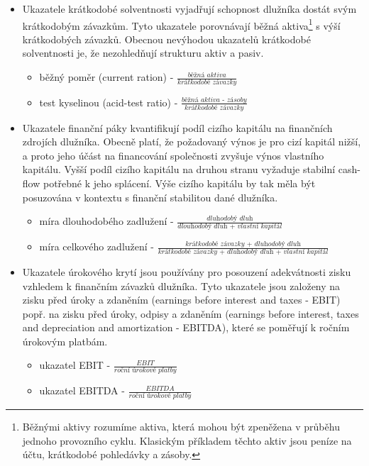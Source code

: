 \documentclass[a4paper]{book}
\begin{document}
\begin{itemize}
\item Ukazatele krátkodobé solventnosti vyjadřují schopnost dlužníka dostát svým krátkodobým závazkům. Tyto ukazatele porovnávají běžná aktiva\footnote{Běžnými aktivy rozumíme aktiva, která mohou být zpeněžena v průběhu jednoho provozního cyklu. Klasickým příkladem těchto aktiv jsou peníze na účtu, krátkodobé pohledávky a zásoby.} s výší krátkodobých závazků. Obecnou nevýhodou ukazatelů krátkodobé solventnosti je, že nezohledňují strukturu aktiv a pasiv.
\begin{itemize}
\item běžný poměr (current ration) - $\frac{\textit{b\v{e}\v{z}n\'{a} aktiva}}{\textit{kr\'{a}tkodob\'{e} z\'{a}vazky}}$
\item test kyselinou (acid-test ratio) - $\frac{\textit{b\v{e}\v{z}n\'{a} aktiva - z\'{a}soby}}{\textit{kr\'{a}tkodob\'{e} z\'{a}vazky}}$
\end{itemize}
\item Ukazatele finanční páky kvantifikují podíl cizího kapitálu na finančních zdrojích dlužníka. Obecně platí, že požadovaný výnos je pro cizí kapitál nižší, a proto jeho účást na financování společnosti zvyšuje výnos vlastního kapitálu. Vyšší podíl cizího kapitálu na druhou stranu vyžaduje stabilní cash-flow potřebné k jeho splácení. Výše cizího kapitálu by tak měla být posuzována v kontextu s finanční stabilitou dané dlužníka.
\begin{itemize}
\item míra dlouhodobého zadlužení - $\frac{\textit{dluhodob\'{y} dluh}}{\textit{dlouhodob\'{y} dluh + vlastn\'{i} kapit\'{a}l}}$
\item míra celkového zadlužení - $\frac{\textit{kr\'{a}tkodob\'{e} z\'{a}vazky + dluhodob\'{y} dluh}}{\textit{kr\'{a}tkodob\'{e} z\'{a}vazky + dluhodob\'{y} dluh + vlastn\'{i} kapit\'{a}l}}$
\end{itemize}
\item Ukazatele úrokového krytí jsou používány pro posouzení adekvátnosti zisku vzhledem k finančním závazků dlužníka. Tyto ukazatele jsou založeny na zisku před úroky a zdaněním (earnings before interest and taxes - EBIT) popř. na zisku před úroky, odpisy a zdaněním (earnings before interest, taxes and depreciation and amortization - EBITDA), které se poměřují k ročním úrokovým platbám.
\begin{itemize}
\item ukazatel EBIT - $\frac{\textit{EBIT}}{\textit{ro\v{c}n\'{i} \'{u}rokov\'{e} platby}}$
\item ukazatel EBITDA - $\frac{\textit{EBITDA}}{\textit{ro\v{c}n\'{i} \'{u}rokov\'{e} platby}}$
\end{itemize}
\end{itemize}
\end{document}
